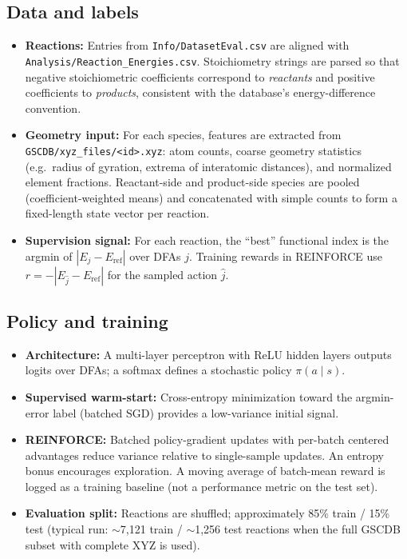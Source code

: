 \documentclass[11pt]{article}
\begin{document}
\subsection{Data and labels}
\begin{itemize}
  \item \textbf{Reactions:} Entries from \texttt{Info/DatasetEval.csv} are aligned with \texttt{Analysis/Reaction\_Energies.csv}. Stoichiometry strings are parsed so that negative stoichiometric coefficients correspond to \emph{reactants} and positive coefficients to \emph{products}, consistent with the database's energy-difference convention.
  \item \textbf{Geometry input:} For each species, features are extracted from \texttt{GSCDB/xyz\_files/<id>.xyz}: atom counts, coarse geometry statistics (e.g.\ radius of gyration, extrema of interatomic distances), and normalized element fractions. Reactant-side and product-side species are pooled (coefficient-weighted means) and concatenated with simple counts to form a fixed-length state vector per reaction.
  \item \textbf{Supervision signal:} For each reaction, the ``best'' functional index is the argmin of $|E_j - E_{\mathrm{ref}}|$ over DFAs $j$. Training rewards in REINFORCE use $r = -|E_{\hat j} - E_{\mathrm{ref}}|$ for the sampled action $\hat j$.
\end{itemize}

\subsection{Policy and training}
\begin{itemize}
  \item \textbf{Architecture:} A multi-layer perceptron with ReLU hidden layers outputs logits over DFAs; a softmax defines a stochastic policy $\pi(a \mid s)$.
  \item \textbf{Supervised warm-start:} Cross-entropy minimization toward the argmin-error label (batched SGD) provides a low-variance initial signal.
  \item \textbf{REINFORCE:} Batched policy-gradient updates with per-batch centered advantages reduce variance relative to single-sample updates. An entropy bonus encourages exploration. A moving average of batch-mean reward is logged as a training baseline (not a performance metric on the test set).
  \item \textbf{Evaluation split:} Reactions are shuffled; approximately 85\% train / 15\% test (typical run: $\sim$7{,}121 train / $\sim$1{,}256 test reactions when the full GSCDB subset with complete XYZ is used).
\end{itemize}
\end{document}
